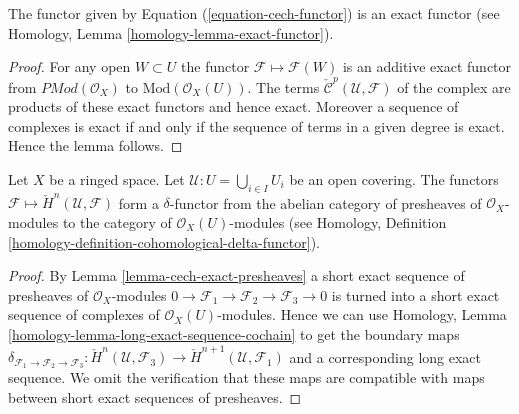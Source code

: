 \begin{lemma}
\label{lemma-cech-exact-presheaves}
The functor given by Equation (\ref{equation-cech-functor})
is an exact functor (see Homology, Lemma \ref{homology-lemma-exact-functor}).
\end{lemma}

\begin{proof}
For any open $W \subset U$ the functor
$\mathcal{F} \mapsto \mathcal{F}(W)$ is an additive exact functor
from $\textit{PMod}(\mathcal{O}_X)$ to $\text{Mod}(\mathcal{O}_X(U))$.
The terms
$\check{\mathcal{C}}^p(\mathcal{U}, \mathcal{F})$
of the complex are products of these exact functors and hence exact.
Moreover a sequence of complexes is exact if and only if the sequence
of terms in a given degree is exact. Hence the lemma follows.
\end{proof}

\begin{lemma}
\label{lemma-cech-cohomology-delta-functor-presheaves}
Let $X$ be a ringed space.
Let $\mathcal{U} : U = \bigcup_{i \in I} U_i$ be an open covering.
The functors $\mathcal{F} \mapsto \check{H}^n(\mathcal{U}, \mathcal{F})$
form a $\delta$-functor from the abelian category of
presheaves of $\mathcal{O}_X$-modules to the category
of $\mathcal{O}_X(U)$-modules (see
Homology, Definition \ref{homology-definition-cohomological-delta-functor}).
\end{lemma}

\begin{proof}
By
Lemma \ref{lemma-cech-exact-presheaves}
a short exact sequence of presheaves of
$\mathcal{O}_X$-modules
$0 \to \mathcal{F}_1 \to \mathcal{F}_2 \to \mathcal{F}_3 \to 0$
is turned into a short exact sequence of complexes of
$\mathcal{O}_X(U)$-modules. Hence we can use
Homology, Lemma \ref{homology-lemma-long-exact-sequence-cochain}
to get the boundary maps
$\delta_{\mathcal{F}_1 \to \mathcal{F}_2 \to \mathcal{F}_3} :
\check{H}^n(\mathcal{U}, \mathcal{F}_3) \to
\check{H}^{n + 1}(\mathcal{U}, \mathcal{F}_1)$
and a corresponding long exact sequence. We omit the verification
that these maps are compatible with maps between short exact
sequences of presheaves.
\end{proof}


